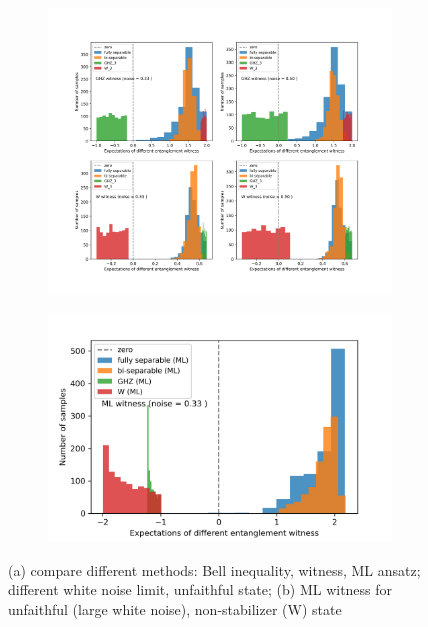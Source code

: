 \documentclass[
reprint,
aps,
pra,
]{revtex4-2}
\theoremstyle{plain}
\theoremstyle{definition}
\begin{document}
\begin{figure}[!ht]
	\centering
	\begin{subfigure}{0.45\textwidth}
	\centering
		\includegraphics[width=.98\linewidth]{./Code/fidelity_witness_compare.png}
	\end{subfigure}
	\begin{subfigure}{0.52\textwidth}
	\centering
		\includegraphics[width=.95\linewidth]{./Code/three_qubit_hist_.png}
	\end{subfigure}
	\caption{(a) compare different methods: Bell inequality, witness, ML ansatz; different white noise limit, unfaithful state; (b) ML witness for unfaithful (large white noise), non-stabilizer (W) state}
\end{figure}
\end{document}
